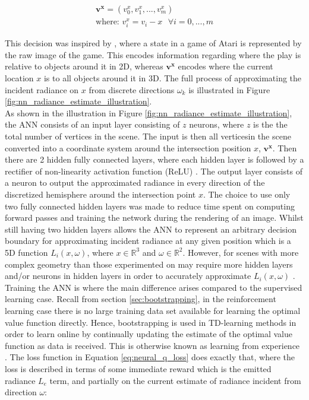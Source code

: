 \documentclass[../dissertation.tex]{subfiles}
\begin{document}
\begin{gather*}
\mathbf{v^x} = (v^x_0, v^x_1, ..., v^x_m)\\
\text{where: } v^x_i = v_i - x \ \ \ \forall i = 0, ..., m \nonumber
\end{gather*}

This decision was inspired by \cite{mnih2013playing}, where a state in a game of Atari is represented by the raw image of the game. This encodes information regarding where the play is relative to objects around it in 2D, whereas $\mathbf{v^x}$ encodes where the current location $x$ is to all objects around it in 3D. The full process of approximating the incident radiance on $x$ from discrete directions $\omega_k$ is illustrated in Figure \ref{fig:nn_radiance_estimate_illustration}.\\


As shown in the illustration in Figure \ref{fig:nn_radiance_estimate_illustration}, the ANN consists of an input layer consisting of $z$ neurons, where $z$ is the the total number of vertices in the scene. The input is then all verticesin the scene converted into a coordinate system around the intersection position $x$, $\mathbf{v^x}$. Then there are 2 hidden fully connected layers, where each hidden layer is followed by a rectifier of non-linearity activation function (ReLU) \cite{nair2010rectified}. The output layer consists of a neuron to output the approximated radiance in every direction of the discretized hemisphere around the intersection point $x$. The choice to use only two fully connected hidden layers was made to reduce time spent on computing forward passes and training the network during the rendering of an image. Whilst still having two hidden layers allows the ANN to represent an arbitrary decision boundary for approximating incident radiance at any given position which is a 5D function $L_i(x, \omega)$, where $x \in \mathbb{R}^3$  and $\omega \in \mathbb{R}^2$. However, for scenes with more complex geometry than those experimented on may require more hidden layers and/or neurons in hidden layers in order to accurately approximate $L_i(x, \omega)$ \cite{ren2013global}.\\

Training the ANN is where the main difference arises compared to the supervised learning case. Recall from section \ref{sec:bootstrapping}, in the reinforcement learning case there is no large training data set available for learning the optimal value function directly. Hence, bootstrapping is used in TD-learning methods in order to learn online by continually updating the estimate of the optimal value function as data is received. This is otherwise known as learning from experience \cite{sutton2011reinforcement}. The loss function in Equation \ref{eq:neural_q_loss} does exactly that, where the loss is described in terms of some immediate reward which is the emitted radiance $L_e$ term, and partially on the current estimate of radiance incident from direction $\omega$:
\end{document}
